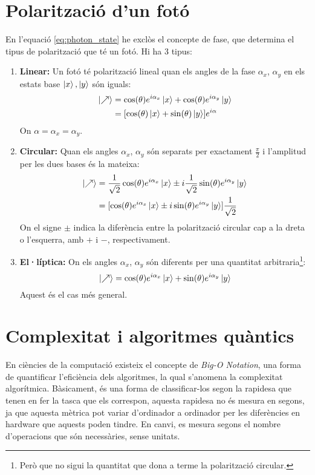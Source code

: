 \chapter{Polarització d'un fotó}
\label{appendix:optics}
En l'equació \ref{eq:photon_state} he exclòs el concepte de fase, que determina el tipus de polarització que té un fotó. Hi ha 3 tipus:
\begin{enumerate}
	\item \textbf{Linear:}
	Un fotó té polarització lineal quan els angles de la fase $\alpha_x$, $\alpha_y$ en els estats base $\ket{x},\ket{y}$ són iguals:
	\begin{align*}
		\ket{\nearrow} &= \cos(\theta) e^{i\alpha_x}\ket{x} + \cos(\theta)e^{i\alpha_y}\ket{y} \\
		&= [\cos(\theta)\ket{x} + \sin(\theta)\ket{y}]e^{i\alpha}
	\end{align*}
	On $\alpha=\alpha_x=\alpha_y$.
	\item \textbf{Circular:}
	Quan els angles $\alpha_x$, $\alpha_y$ són separats per exactament $\frac{\pi}{2}$ i l'amplitud per les dues bases és la mateixa:
	\begin{align*}
		\ket{\nearrow} &= \frac{1}{\sqrt{2}}\cos(\theta)e^{i\alpha_x}\ket{x} \pm i\frac{1}{\sqrt{2}}\sin(\theta)e^{i\alpha_y}\ket{y} \\
					   &= [\cos(\theta)e^{i\alpha_x}\ket{x} \pm i\sin(\theta)e^{i\alpha_y}\ket{y}]\frac{1}{\sqrt{2}}
	\end{align*}
	On el signe $\pm$ indica la diferència entre la polarització circular cap a la dreta o l'esquerra, amb $+$ i $-$, respectivament.
	\item \textbf{El·líptica:}
	On els angles $\alpha_x$, $\alpha_y$ són diferents per una quantitat arbitraria\footnote{Però que no sigui la quantitat que dona a terme la polarització circular.}:
	$$
	\ket{\nearrow} = \cos(\theta)e^{i\alpha_x}\ket{x} + \sin(\theta)e^{i\alpha_y}\ket{y}
	$$
	Aquest és el cas més general.
	
\end{enumerate}

\chapter{Complexitat i algoritmes quàntics}
\label{complexity}
En ciències de la computació existeix el concepte de \textit{Big-O Notation}, una forma de quantificar l'eficiència dels algoritmes, la qual s'anomena la complexitat algorítmica. Bàsicament, és una forma de classificar-los segon la rapidesa que tenen en fer la tasca que els correspon, aquesta rapidesa no és mesura en segons, ja que aquesta mètrica pot variar d'ordinador a ordinador per les diferències en hardware que aquests poden tindre. En canvi, es mesura segons el nombre d'operacions que són necessàries, sense unitats.

